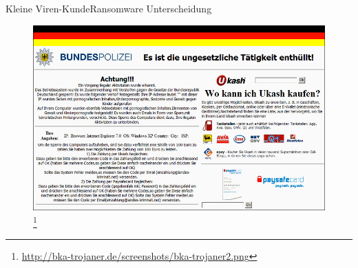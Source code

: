 \documentclass[notes,10pt]{beamer}
\begin{document}
\begin{frame}{Kleine Viren-Kunde}{Ransomware Unterscheidung}

	\begin{figure}[p]
		\centering
		\includegraphics[scale=0.25]{bka-trojaner.png}
		\let\thefootnote\relax\footnote{\url{http://bka-trojaner.de/screenshots/bka-trojaner2.png}}
	\end{figure}

\end{frame}
\end{document}
